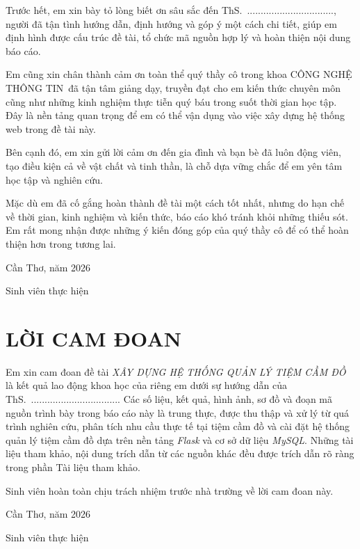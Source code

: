 \documentclass[13pt,a4paper]{extreport}
\newcommand{\TenDeTai}{XÂY DỰNG HỆ THỐNG QUẢN LÝ TIỆM CẦM ĐỒ}
\newcommand{\Khoa}{CÔNG NGHỆ THÔNG TIN}
\newcommand{\GVHD}{ThS.\ ................................}
\begin{document}
Trước hết, em xin bày tỏ lòng biết ơn sâu sắc đến \GVHD, người đã tận tình hướng dẫn, định hướng và góp ý một cách chi tiết, giúp em định hình được cấu trúc đề tài, tổ chức mã nguồn hợp lý và hoàn thiện nội dung báo cáo.

Em cũng xin chân thành cảm ơn toàn thể quý thầy cô trong khoa \Khoa\ đã tận tâm giảng dạy, truyền đạt cho em kiến thức chuyên môn cũng như những kinh nghiệm thực tiễn quý báu trong suốt thời gian học tập. Đây là nền tảng quan trọng để em có thể vận dụng vào việc xây dựng hệ thống web trong đề tài này.

Bên cạnh đó, em xin gửi lời cảm ơn đến gia đình và bạn bè đã luôn động viên, tạo điều kiện cả về vật chất và tinh thần, là chỗ dựa vững chắc để em yên tâm học tập và nghiên cứu.

Mặc dù em đã cố gắng hoàn thành đề tài một cách tốt nhất, nhưng do hạn chế về thời gian, kinh nghiệm và kiến thức, báo cáo khó tránh khỏi những thiếu sót. Em rất mong nhận được những ý kiến đóng góp của quý thầy cô để có thể hoàn thiện hơn trong tương lai.

\vspace{1cm}
\hfill Cần Thơ, năm 2026

\hfill Sinh viên thực hiện

\chapter*{LỜI CAM ĐOAN}

Em xin cam đoan đề tài \emph{\TenDeTai} là kết quả lao động khoa học của riêng em dưới sự hướng dẫn của \GVHD. Các số liệu, kết quả, hình ảnh, sơ đồ và đoạn mã nguồn trình bày trong báo cáo này là trung thực, được thu thập và xử lý từ quá trình nghiên cứu, phân tích nhu cầu thực tế tại tiệm cầm đồ và cài đặt hệ thống quản lý tiệm cầm đồ dựa trên nền tảng \emph{Flask} và cơ sở dữ liệu \emph{MySQL}. Những tài liệu tham khảo, nội dung trích dẫn từ các nguồn khác đều được trích dẫn rõ ràng trong phần Tài liệu tham khảo.

Sinh viên hoàn toàn chịu trách nhiệm trước nhà trường về lời cam đoan này.

\vspace{1cm}
\hfill Cần Thơ, năm 2026

\hfill Sinh viên thực hiện

\end{document}
